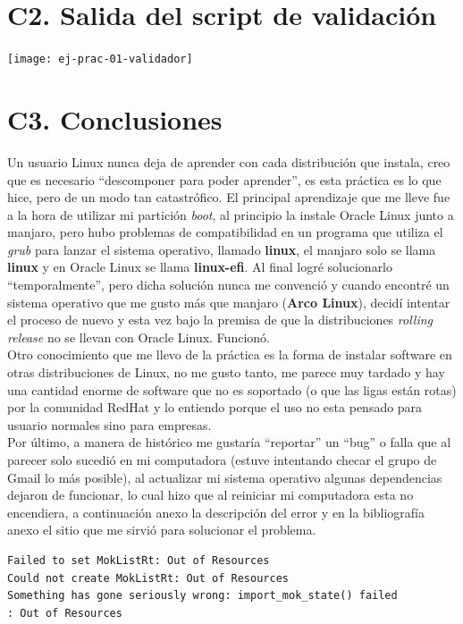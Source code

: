 \documentclass{article}
\begin{document}
\section*{C2. Salida del script de validación}

\begin{center}
    \texttt{[image: ej-prac-01-validador]}    
\end{center}

\section*{C3. Conclusiones}
Un usuario Linux nunca deja de aprender con cada distribución que instala, 
creo que es necesario ``descomponer para poder aprender'', es esta práctica es 
lo que hice, pero de un modo tan catastrófico. El principal aprendizaje que me 
lleve fue a la hora de utilizar mi partición \textit{boot}, al principio la
instale Oracle Linux junto a manjaro, pero hubo problemas de compatibilidad 
en un programa que utiliza el \textit{grub} para lanzar el sistema operativo,
llamado \textbf{linux}, el manjaro solo se llama \textbf{linux} y en Oracle 
Linux se llama \textbf{linux-efi}. Al final logré solucionarlo 
``temporalmente'', pero dicha solución nunca me convenció y cuando encontré un 
sistema operativo que me gusto más que manjaro (\textbf{Arco Linux}), decidí
intentar el proceso de nuevo y esta vez bajo la premisa de que la distribuciones
\textit{rolling release} no se llevan con Oracle Linux. Funcionó.\\

Otro conocimiento que me llevo de la práctica es la forma de instalar software 
en otras distribuciones de Linux, no me gusto tanto, me parece muy tardado y 
hay una cantidad enorme de software que no es soportado (o que las ligas están
rotas) por la comunidad RedHat y lo entiendo porque el uso no esta pensado para
usuario normales sino para empresas.\\

Por último, a manera de histórico me gustaría ``reportar'' un ``bug'' o falla
que al parecer solo sucedió en mi computadora (estuve intentando checar
el grupo de Gmail lo más posible),  al actualizar mi sistema operativo algunas
dependencias dejaron de funcionar, lo cual hizo que al reiniciar mi computadora
esta no encendiera, a continuación anexo la descripción del error y en la 
bibliografía anexo el sitio que me sirvió para solucionar el problema.

\begin{verbatim}
Failed to set MokListRt: Out of Resources
Could not create MokListRt: Out of Resources
Something has gone seriously wrong: import_mok_state() failed
: Out of Resources
\end{verbatim}
\end{document}
